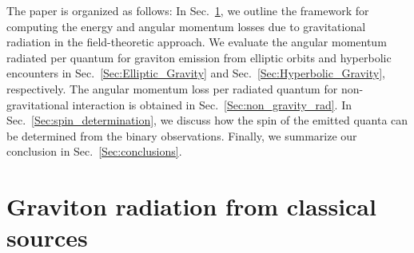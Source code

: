 \documentclass[aps,prd]{revtex4-2}
\begin{document}
The paper is organized as follows: In Sec.~\ref{Sec:classical_background}, we outline the framework for computing the energy and angular momentum losses due to gravitational radiation in the field-theoretic approach. We evaluate the angular momentum radiated per quantum for graviton emission from elliptic orbits and hyperbolic encounters in Sec.~\ref{Sec:Elliptic_Gravity} and Sec.~\ref{Sec:Hyperbolic_Gravity}, respectively. The angular momentum loss per radiated quantum for non-gravitational interaction is obtained in Sec.~\ref{Sec:non_gravity_rad}. In Sec.~\ref{Sec:spin_determination}, we discuss how the spin of the emitted quanta can be determined from the binary observations. Finally, we summarize our conclusion in Sec.~\ref{Sec:conclusions}.

\section{Graviton radiation from classical sources}\label{Sec:classical_background}
\end{document}
